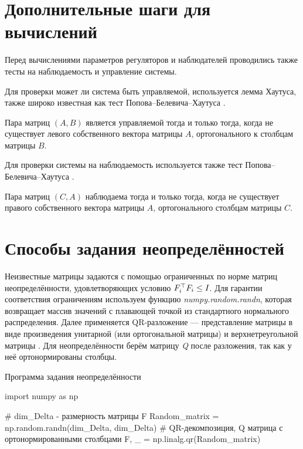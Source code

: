 \chapter{Дополнительные шаги для вычислений}\label{app:B}

Перед вычислениями параметров регуляторов и наблюдателей проводились также тесты на наблюдаемость и управление системы. 

Для проверки может ли система быть управляемой, используется лемма Хаутуса, также широко известная как тест Попова--Белевича--Хаутуса \cite{bernstein2018scalar}.
\begin{lemma}
	Пара матриц $(A, B)$ является управляемой тогда и только тогда, когда не существует левого собственного вектора матрицы $A$, ортогонального к столбцам матрицы $B$.
\end{lemma}

Для проверки системы на наблюдаемость используется также тест Попова--Белевича--Хаутуса \cite{Sontag1998}.

\begin{lemma}
	Пара матриц $(C, A)$ наблюдаема тогда и только тогда, когда не существует правого собственного вектора матрицы $A$, ортогонального столбцам матрицы $C$.
\end{lemma}

\chapter{Способы задания неопределённостей}\label{app:С}
	
Неизвестные матрицы задаются с помощью ограниченных по норме матриц неопределённости, удовлетворяющих условию ${F}_i^\top{F}_i\leq {I}$. Для гарантии соответствия ограничениям используем функцию \textit{numpy.random.randn}, которая возвращает массив значений с плавающей точкой из стандартного нормального распределения. Далее применяется QR-разложение --- представление матрицы в виде произведения унитарной (или ортогональной матрицы) и верхнетреугольной матрицы \cite{horn1990matrix}. Для неопределённости берём матрицу \textit{Q} после разложения, так как у неё ортонормированы столбцы.

\begin{ListingEnv}[!h]	
\captiondelim{ } %
\caption{Программа задания неопределённости}\label{lst:delta}
	\begin{Verb}
		import numpy as np
		
		# dim_Delta - размерность матрицы F
		Random_matrix = np.random.randn(dim_Delta, dim_Delta)
		# QR-декомпозиция, Q матрица с ортонормированными столбцами
		F, _ = np.linalg.qr(Random_matrix)
	\end{Verb}
\end{ListingEnv}